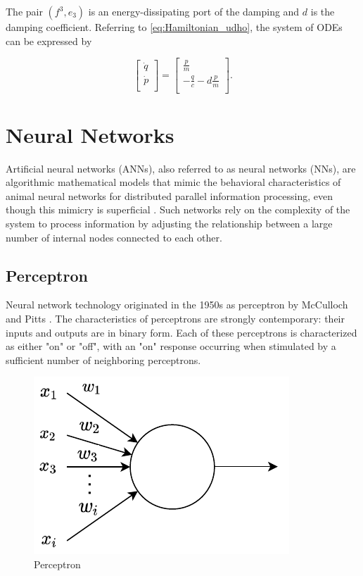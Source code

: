 \documentclass[
	parskip, 			   %
	twoside, 			   %
	DIV=14, 			   %
	BCOR=15.0mm, 		   %
	headsepline, 		   %
	open=right, 		   %
	captions=tableheading, %
	bibliography=totoc,    %
	numbers=noenddot       %
]{scrreprt}
\begin{document}
The pair $(f^3, e_3)$ is an energy-dissipating port of the damping and $d$ is the damping coefficient. Referring to \ref{eq:Hamiltonian_udho}, the system of ODEs can be expressed by

\begin{equation}
    \label{eq:ODE_isothermal_damped_harmonic_oscillator}
    \begin{bmatrix}
    \dot{q}\\
    \dot{p}\\
    \end{bmatrix}
    =
    \begin{bmatrix}
    \frac{p}{m}\\
    -\frac{q}{c}-d\frac{p}{m}\\
    \end{bmatrix}.
\end{equation}


\clearpage
\chapter{Neural Networks}
\label{ch:chapter4}
Artificial neural networks (ANNs), also referred to as neural networks (NNs), are algorithmic mathematical models that mimic the behavioral characteristics of animal neural networks for distributed parallel information processing, even though this mimicry is superficial \cite{russell2010artificial}. Such networks rely on the complexity of the system to process information by adjusting the relationship between a large number of internal nodes connected to each other.

\section{Perceptron}
Neural network technology originated in the 1950s as perceptron by McCulloch and Pitts \cite{mcculloch1943logical}. The characteristics of perceptrons are strongly contemporary: their inputs and outputs are in binary form. Each of these perceptrons is characterized as either "on" or "off", with an "on" response occurring when stimulated by a sufficient number of neighboring perceptrons.

\begin{figure}[h!]
    \centering
    \includegraphics[scale=1]{figures/perceptron.pdf}
    \caption{Perceptron}
    \label{fig:perceptron}
\end{figure}
\end{document}
